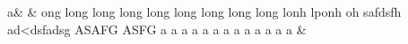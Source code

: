 \documentclass{memoir}
\begin{document}
\makeatletter
\beginnumbering
\stanza
{}a&
&
ong long long long long long long long long lonh lponh oh safdsfh 
ad<dsfadsg ASAFG ASFG a a a a a a a a a a a a  a 
\&
\endnumbering
\end{document}
